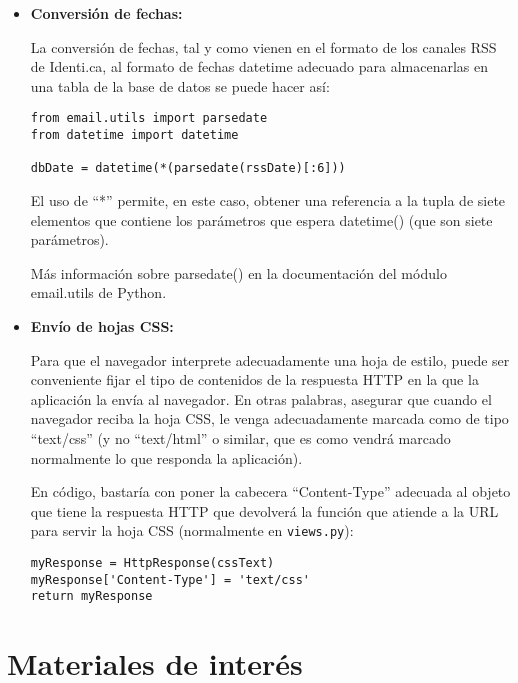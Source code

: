 \begin{itemize}
\item \textbf{Conversión de fechas:}

La conversión de fechas, tal y como vienen en el formato de los canales RSS de Identi.ca, al formato de fechas datetime adecuado para almacenarlas en una tabla de la base de datos se puede hacer así:

\begin{verbatim}
from email.utils import parsedate
from datetime import datetime

dbDate = datetime(*(parsedate(rssDate)[:6]))
\end{verbatim}

El uso de ``*'' permite, en este caso, obtener una referencia a la tupla de siete elementos que contiene los parámetros que espera datetime() (que son siete parámetros).

Más información sobre parsedate() en la documentación del módulo email.utils de Python.

\item \textbf{Envío de hojas CSS:}

Para que el navegador interprete adecuadamente una hoja de estilo, puede ser conveniente fijar el tipo de contenidos de la respuesta HTTP en la que la aplicación la envía al navegador. En otras palabras, asegurar que cuando el navegador reciba la hoja CSS, le venga adecuadamente marcada como de tipo ``text/css'' (y no ``text/html'' o similar, que es como vendrá marcado normalmente lo que responda la aplicación).

En código, bastaría con poner la cabecera ``Content-Type'' adecuada al objeto que tiene la respuesta HTTP que devolverá la función que atiende a la URL para servir la hoja CSS (normalmente en \texttt{views.py}):

\begin{verbatim}
myResponse = HttpResponse(cssText)
myResponse['Content-Type'] = 'text/css'
return myResponse
\end{verbatim}

\end{itemize}

\newpage

\section{Materiales de interés}

